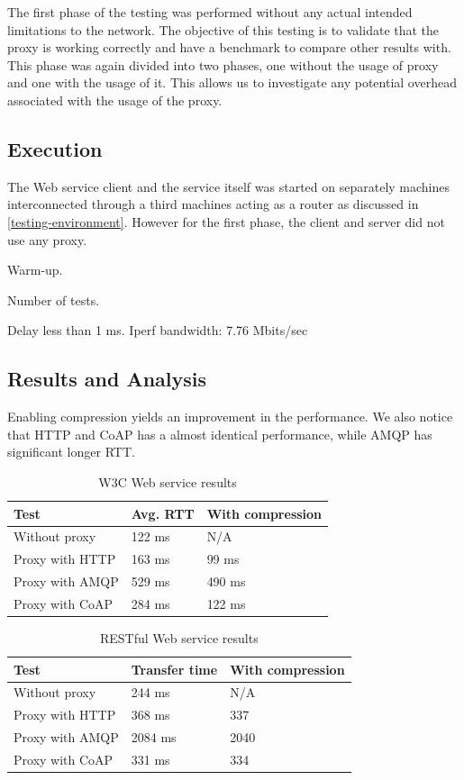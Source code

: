 The first phase of the testing was performed without any actual intended
limitations to the network. The objective of this testing is to validate that
the proxy is working correctly and have a benchmark to compare other results
with. This phase was again divided into two phases, one without the usage of
proxy and one with the usage of it. This allows us to investigate any potential
overhead associated with the usage of the proxy.

\subsection{Execution}

The Web service client and the service itself was started on separately machines
interconnected through a third machines acting as a router as discussed in
\cref{testing-environment}. However for the first phase, the client and server
did not use any proxy.

Warm-up.

Number of tests.

Delay less than 1 ms.
Iperf bandwidth: 7.76 Mbits/sec


\subsection{Results and Analysis}

Enabling compression yields an improvement in the performance. We also notice
that HTTP and CoAP has a almost identical performance, while AMQP has
significant longer RTT.

\begin{table}[h!]
\begin{tabular}{| l | l | l |}
\hline
  \textbf{Test} & \textbf{Avg. RTT} & \textbf{With compression}\\ \hline
  Without proxy & 122 ms & N/A \\ \hline
  Proxy with HTTP & 163 ms & 99 ms \\ \hline
  Proxy with AMQP & 529 ms & 490 ms \\ \hline
  Proxy with CoAP & 284 ms & 122 ms \\ \hline
\end{tabular}
\caption{W3C Web service results}
\end{table}

\begin{table}[h!]
\begin{tabular}{| l | l | l |}
\hline
  \textbf{Test} & \textbf{Transfer time} & \textbf{With compression}\\ \hline
  Without proxy & 244 ms & N/A \\ \hline
  Proxy with HTTP & 368 ms & 337\\ \hline
  Proxy with AMQP & 2084 ms & 2040\\ \hline
  Proxy with CoAP & 331 ms & 334\\ \hline
\end{tabular}
\caption{RESTful Web service results}
\end{table}


